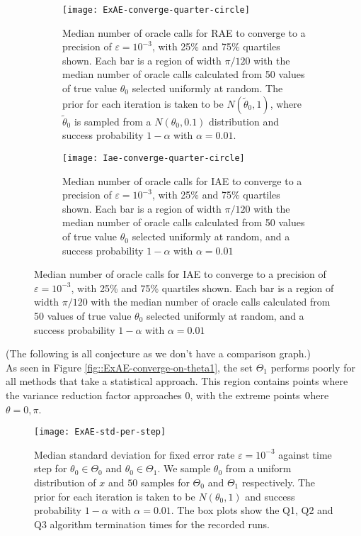 \begin{figure}[htbp]
	\centering

	\begin{subfigure}{0.45\textwidth}
		\centering
		\texttt{[image: ExAE-converge-quarter-circle]}
		\caption{Median number of oracle calls for RAE to converge to a precision of $\varepsilon = 10^{-3}$, with 25\% and 75\% quartiles shown. Each bar is a region of width $\pi / 120$ with the median number of oracle calls calculated from 50 values of true value $\theta_0$ selected uniformly at random. The prior for each iteration is taken to be $N(\tilde{\theta}_0, 1)$, where $\tilde{\theta}_0$ is sampled from a $N(\theta_0, 0.1)$ distribution and success probability $1 - \alpha$ with $\alpha = 0.01$.}
		\label{fig::ExAE-converge-quarter-circle}
	\end{subfigure}
	\hfill
	\begin{subfigure}{0.45\textwidth}
		\centering
		\texttt{[image: Iae-converge-quarter-circle]}
		\caption{Median number of oracle calls for IAE to converge to a precision of $\varepsilon = 10^{-3}$, with 25\% and 75\% quartiles shown. Each bar is a region of width $\pi / 120$ with the median number of oracle calls calculated from 50 values of true value $\theta_0$ selected uniformly at random, and a success probability $1 - \alpha$ with $\alpha = 0.01$}
		\label{fig::Iae-converge-quarter-circle}
	\end{subfigure}
\end{figure}
\begin{center}
	\color{red}
	(The following is all conjecture as we don't have a comparison graph.) \\
As seen in Figure \ref{fig::ExAE-converge-on-theta1}, the set $\Theta_1$ performs poorly for all methods that take a statistical approach. This region contains points where the variance reduction factor approaches 0, with the extreme points where $\theta= 0, \pi$.
\end{center}

\begin{figure}[htbp]
	\centering
	\texttt{[image: ExAE-std-per-step]}
	\caption{Median standard deviation for fixed error rate $\varepsilon = 10^{-3}$ against time step for $\theta_0 \in \Theta_0$ and $\theta_0 \in \Theta_1$. We sample $\theta_0$ from a uniform distribution of $x$ and $50$ samples for $\Theta_0$ and $ \Theta_1$ respectively. The prior for each iteration is taken to be $N(\theta_0, 1)$ and success probability $1 - \alpha$ with $\alpha = 0.01$. The box plots show the Q1, Q2 and Q3 algorithm termination times for the recorded runs.}
	\label{fig::ExAE-std-per-step}
\end{figure}

